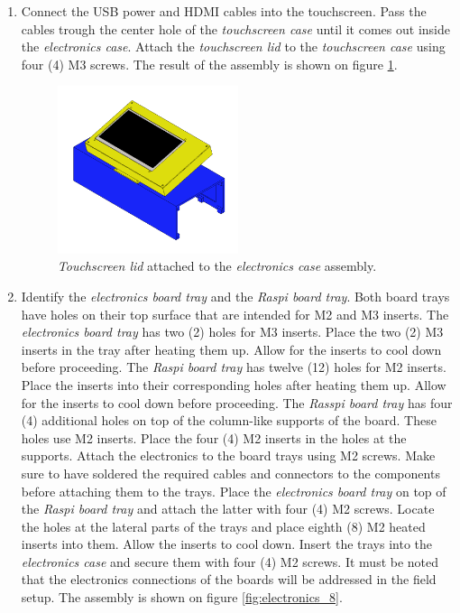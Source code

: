 \documentclass{article}
\begin{document}
\begin{enumerate}
    \item Connect the USB power and HDMI cables into the touchscreen. Pass the cables trough the center hole of the \textit{touchscreen case} until it comes out inside the \textit{electronics case}. Attach the \textit{touchscreen lid} to the \textit{touchscreen case} using four (4) M3 screws. The result of the assembly is shown on figure \ref{fig:electronics_7}.
    
    \begin{figure}[H]
        \centering
        \includegraphics[width=0.5\textwidth]{images/electronics/step_G.png}
        \caption{\textit{Touchscreen lid} attached to the \textit{electronics case} assembly.}
        \label{fig:electronics_7}
    \end{figure}
    
    \item Identify the \textit{electronics board tray} and the \textit{Raspi board tray}. Both board trays have holes on their top surface that are intended for M2 and M3 inserts. The \textit{electronics board tray} has two (2) holes for M3 inserts. Place the two (2) M3 inserts in the tray after heating them up. Allow for the inserts to cool down before proceeding. The \textit{Raspi board tray} has twelve (12) holes for M2 inserts. Place the inserts into their corresponding holes after heating them up. Allow for the inserts to cool down before proceeding. The \textit{Rasspi board tray} has four (4) additional holes on top of the column-like supports of the board. These holes use M2 inserts. Place the four (4) M2 inserts in the holes at the supports. Attach the electronics to the board trays using M2 screws. Make sure to have soldered the required cables and connectors to the components before attaching them to the trays. Place the \textit{electronics board tray} on top of the \textit{Raspi board tray} and attach the latter with four (4) M2 screws. Locate the holes at the lateral parts of the trays and place eighth (8) M2 heated inserts into them. Allow the inserts to cool down. Insert the trays into the \textit{electronics case} and secure them with four (4) M2 screws. It must be noted that the electronics connections of the boards will be addressed in the field setup. The assembly is shown on figure \ref{fig:electronics_8}.
    

\end{enumerate}
\end{document}
